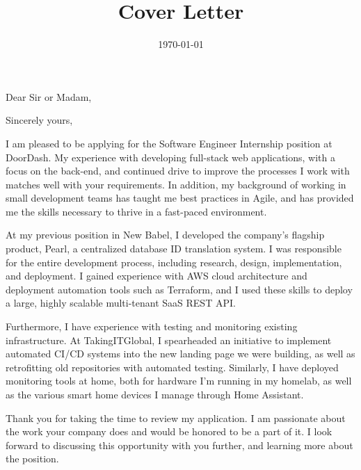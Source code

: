 \documentclass[11pt, letterpaper, sans]{moderncv}
\title{Cover Letter}
\begin{document}
\clearpage

\newcommand{\positionname}{Software Engineer Internship} %
\newcommand{\companyname}{DoorDash} %

\recipient{HR Department}{\companyname{}} %
\date{\today} %
\opening{Dear Sir or Madam,} %
\closing{Sincerely yours,} %

\makelettertitle %

I am pleased to be applying for the \positionname{} position at \companyname{}.
My experience with developing full-stack web applications,
with a focus on the back-end,
and continued drive to improve the processes I work with matches well with your requirements.
In addition, my background of working in small development teams
has taught me best practices in Agile,
and has provided me the skills necessary to thrive in a fast-paced environment.

At my previous position in New Babel,
I developed the company's flagship product, Pearl, a centralized database ID translation system.
I was responsible for the entire development process,
including research, design, implementation, and deployment.
I gained experience with AWS cloud architecture
and deployment automation tools such as Terraform,
and I used these skills to deploy a large, 
highly scalable multi-tenant SaaS REST API.

Furthermore, I have experience with testing and monitoring existing infrastructure.
At TakingITGlobal, I spearheaded an initiative to implement automated CI/CD systems
into the new landing page we were building,
as well as retrofitting old repositories with automated testing.
Similarly, I have deployed monitoring tools at home,
both for hardware I'm running in my homelab,
as well as the various smart home devices I manage through Home Assistant.

Thank you for taking the time to review my application.
I am passionate about the work your company does and would be honored to be a part of it.
I look forward to discussing this opportunity with you further,
and learning more about the position.

\makeletterclosing %

\newpage
\end{document}
